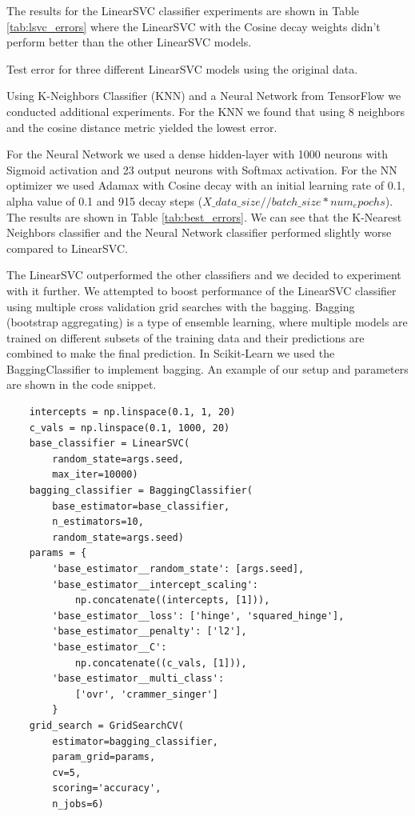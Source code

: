 The results for the LinearSVC classifier experiments are shown in Table \ref{tab:lsvc_errors} where the LinearSVC with the Cosine decay weights didn't perform better than the other LinearSVC models.

\begin{table}[!ht]
\centering
\caption{Test error for three different LinearSVC models using the original data.}

\label{tab:lsvc_errors}
\end{table}

Using K-Neighbors Classifier (KNN) and a Neural Network from TensorFlow we conducted additional experiments. For the KNN we found that using 8 neighbors and the cosine distance metric yielded the lowest error. 

For the Neural Network we used a dense hidden-layer with 1000 neurons with Sigmoid activation and 23 output neurons with Softmax activation. For the NN optimizer we used Adamax with Cosine decay with an initial learning rate of 0.1, alpha value of 0.1 and 915 decay steps ($X\_data\_size // batch\_size * num_epochs$). The results are shown in Table \ref{tab:best_errors}. We can see that the K-Nearest Neighbors classifier and the Neural Network classifier performed slightly worse compared to LinearSVC.

The LinearSVC outperformed the other classifiers and we decided to experiment with it further. We attempted to boost performance of the LinearSVC classifier using multiple cross validation grid searches with the bagging. Bagging (bootstrap aggregating) is a type of ensemble learning, where multiple models are trained on different subsets of the training data and their predictions are combined to make the final prediction. In Scikit-Learn we used the BaggingClassifier to implement bagging. An example of our setup and parameters are shown in the code snippet. 

\begin{verbatim}
    intercepts = np.linspace(0.1, 1, 20)
    c_vals = np.linspace(0.1, 1000, 20)
    base_classifier = LinearSVC(
        random_state=args.seed, 
        max_iter=10000)
    bagging_classifier = BaggingClassifier(
        base_estimator=base_classifier, 
        n_estimators=10, 
        random_state=args.seed)
    params = {
        'base_estimator__random_state': [args.seed],
        'base_estimator__intercept_scaling': 
            np.concatenate((intercepts, [1])),
        'base_estimator__loss': ['hinge', 'squared_hinge'],
        'base_estimator__penalty': ['l2'],
        'base_estimator__C': 
            np.concatenate((c_vals, [1])),
        'base_estimator__multi_class': 
            ['ovr', 'crammer_singer']
        }
    grid_search = GridSearchCV(
        estimator=bagging_classifier, 
        param_grid=params, 
        cv=5,
        scoring='accuracy',
        n_jobs=6)
\end{verbatim}

